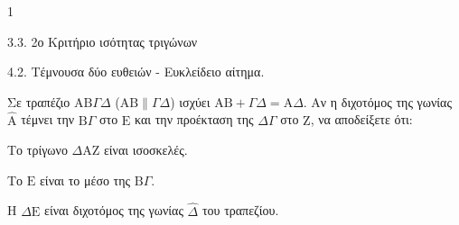 \begin{ylh}{1}
    \item 3.3. 2ο Κριτήριο ισότητας τριγώνων
    \item 4.2. Τέμνουσα δύο ευθειών - Ευκλείδειο αίτημα.
\end{ylh}
Σε τραπέζιο $\mathrm{A}\mathrm{B}\Gamma\Delta$ ($\mathrm{A}\mathrm{B} \parallel \Gamma\Delta$) ισχύει $\mathrm{A}\mathrm{B} + \Gamma\Delta = \mathrm{A}\Delta$. Αν η διχοτόμος της γωνίας $\hat{\mathrm{A}}$ τέμνει την $\mathrm{B}\Gamma$ στο $\mathrm{E}$ και την προέκταση της $\Delta\Gamma$ στο $\mathrm{Z}$, να αποδείξετε ότι:
\begin{alist}
    \item Το τρίγωνο $\Delta\mathrm{A}\mathrm{Z}$ είναι ισοσκελές. 
    \item Το $\mathrm{E}$ είναι το μέσο της $\mathrm{B}\Gamma$. 
    \item Η $\Delta\mathrm{E}$ είναι διχοτόμος της γωνίας $\hat{\Delta}$ του τραπεζίου. 
\end{alist}
